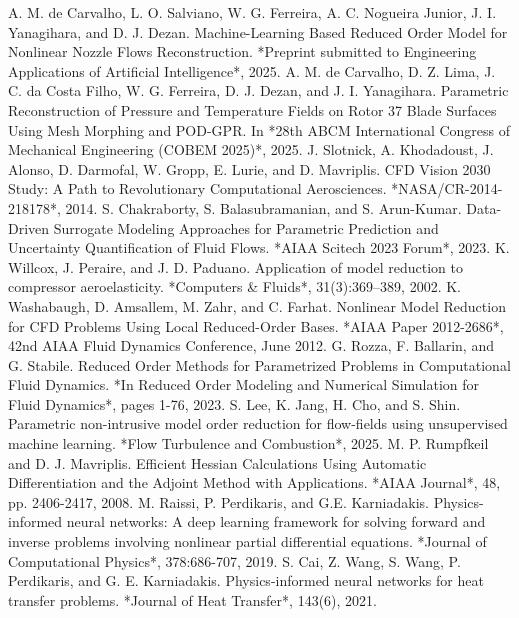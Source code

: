 \documentclass[12pt, a4paper]{report}
\begin{document}

\begin{thebibliography}{99}
     A. M. de Carvalho, L. O. Salviano, W. G. Ferreira, A. C. Nogueira Junior, J. I. Yanagihara, and D. J. Dezan. Machine-Learning Based Reduced Order Model for Nonlinear Nozzle Flows Reconstruction. *Preprint submitted to Engineering Applications of Artificial Intelligence*, 2025.
     A. M. de Carvalho, D. Z. Lima, J. C. da Costa Filho, W. G. Ferreira, D. J. Dezan, and J. I. Yanagihara. Parametric Reconstruction of Pressure and Temperature Fields on Rotor 37 Blade Surfaces Using Mesh Morphing and POD-GPR. In *28th ABCM International Congress of Mechanical Engineering (COBEM 2025)*, 2025.
     J. Slotnick, A. Khodadoust, J. Alonso, D. Darmofal, W. Gropp, E. Lurie, and D. Mavriplis. CFD Vision 2030 Study: A Path to Revolutionary Computational Aerosciences. *NASA/CR-2014-218178*, 2014.
     S. Chakraborty, S. Balasubramanian, and S. Arun-Kumar. Data-Driven Surrogate Modeling Approaches for Parametric Prediction and Uncertainty Quantification of Fluid Flows. *AIAA Scitech 2023 Forum*, 2023.
     K. Willcox, J. Peraire, and J. D. Paduano. Application of model reduction to compressor aeroelasticity. *Computers \& Fluids*, 31(3):369–389, 2002.
     K. Washabaugh, D. Amsallem, M. Zahr, and C. Farhat. Nonlinear Model Reduction for CFD Problems Using Local Reduced-Order Bases. *AIAA Paper 2012-2686*, 42nd AIAA Fluid Dynamics Conference, June 2012.
     G. Rozza, F. Ballarin, and G. Stabile. Reduced Order Methods for Parametrized Problems in Computational Fluid Dynamics. *In Reduced Order Modeling and Numerical Simulation for Fluid Dynamics*, pages 1-76, 2023.
     S. Lee, K. Jang, H. Cho, and S. Shin. Parametric non-intrusive model order reduction for flow-fields using unsupervised machine learning. *Flow Turbulence and Combustion*, 2025.
     M. P. Rumpfkeil and D. J. Mavriplis. Efficient Hessian Calculations Using Automatic Differentiation and the Adjoint Method with Applications. *AIAA Journal*, 48, pp. 2406-2417, 2008.
     M. Raissi, P. Perdikaris, and G.E. Karniadakis. Physics-informed neural networks: A deep learning framework for solving forward and inverse problems involving nonlinear partial differential equations. *Journal of Computational Physics*, 378:686-707, 2019.
     S. Cai, Z. Wang, S. Wang, P. Perdikaris, and G. E. Karniadakis. Physics-informed neural networks for heat transfer problems. *Journal of Heat Transfer*, 143(6), 2021.

\end{thebibliography}
\end{document}
